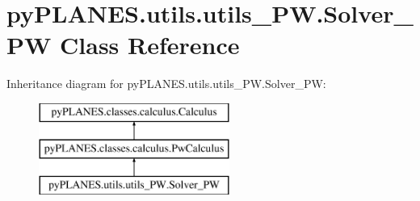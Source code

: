 \hypertarget{classpy_p_l_a_n_e_s_1_1utils_1_1utils___p_w_1_1_solver___p_w}{}\section{py\+P\+L\+A\+N\+E\+S.\+utils.\+utils\+\_\+\+P\+W.\+Solver\+\_\+\+PW Class Reference}
\label{classpy_p_l_a_n_e_s_1_1utils_1_1utils___p_w_1_1_solver___p_w}
Inheritance diagram for py\+P\+L\+A\+N\+E\+S.\+utils.\+utils\+\_\+\+P\+W.\+Solver\+\_\+\+PW\+:\begin{figure}[H]
\begin{center}
\leavevmode
\includegraphics[height=3.000000cm]{classpy_p_l_a_n_e_s_1_1utils_1_1utils___p_w_1_1_solver___p_w}
\end{center}
\end{figure}

